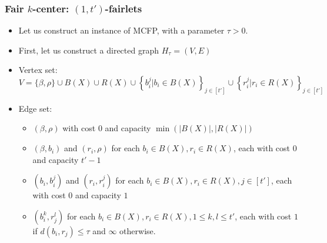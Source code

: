 \documentclass{beamer}
\begin{document}
\begin{frame}
\frametitle{Fair $k$-center: $(1, t')$-fairlets}

\begin{itemize}
	\item Let us construct an instance of MCFP, with a parameter $\tau > 0$. \pause
	
	\item First, let us construct a directed graph $H_\tau = (V, E)$ \pause
	
	\item Vertex set:
$$V = \{\beta, \rho\} \cup B(X) \cup R(X) \cup \left\{ b_i^j | b_i \in B(X) \right\}_{j \in [t']} \cup \left\{ r_i^j | r_i \in R(X) \right\}_{j \in [t']}$$

	\item Edge set:
	\begin{itemize}
		\item $(\beta, \rho)$ with cost 0 and capacity $\min \left( |B(X)|, |R(X)| \right)$
		\item $(\beta, b_i)$ and $(r_i, \rho)$ for each $b_i \in B(X), r_i \in R(X)$, each with cost $0$ and capacity $t' - 1$
		\item $(b_i, b_i^j)$ and $(r_i, r_i^j)$ for each $b_i \in B(X), r_i \in R(X), j \in [t']$, each with cost $0$ and capacity $1$
		\item $(b_i^k, r_j^l)$ for each $b_i \in B(X), r_i \in R(X), 1 \leq k, l \leq t'$, each with cost $1$ if $d(b_i, r_j) \leq \tau$ and $\infty$ otherwise.
	\end{itemize}
	
\end{itemize}

\end{frame}

\end{document}
